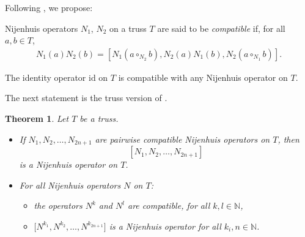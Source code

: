 \documentclass[pdftex]{sigma}
\numberwithin{equation}{section}
\newtheorem{Theorem}{Theorem}[section]
\newcommand{\N}{\mathbb N}
\newcommand{\id}{\mathrm{id}}
\begin{document}
Following \cite{4}, we propose:
\begin{Definition}\label{def.compat}
 Nijenhuis operators $N_1$, $N_2$ on a truss $T$ are said to be \textit{compatible} if, for all $a,b\in T$,
 \begin{gather*}%
 N_1(a)N_2(b) = [ N_1(a\circ_{N_2}b),N_2(a)N_1(b), N_2(a\circ_{N_1}b) ].
 \end{gather*}
\end{Definition}
\begin{Example}\label{ex.com.id}
 The identity operator $\id$ on $T$ is compatible with any Nijenhuis operator on $T$.
\end{Example}
The next statement is the truss version of \cite[Theorems~3 and~4]{4}.
\begin{Theorem}\label{thm.comp}
 Let $T$ be a truss.
 \begin{itemize}\itemsep=0pt
 \item[$(1)$] If $N_1, N_2,\dots,N_{2n+1}$ are pairwise compatible Nijenhuis operators on $T$, then
 \[
 [N_1,N_2,\dots, N_{2n+1}]
 \]
 is a Nijenhuis operator on $T$.
 \item[$(2)$] For all Nijenhuis operators $N$ on $T$:
 \begin{itemize}\itemsep=0pt
 \item[$(a)$] the operators $N^k$ and $N^l$ are compatible, for all $k,l\in \N$,
 \item[$(b)$] $\big[N^{k_1},N^{k_2},\dots, N^{k_{2n+1}}\big]$ is a Nijenhuis operator for all $k_i,n\in \N$.
 \end{itemize}
 \end{itemize}
\end{Theorem}
\end{document}
